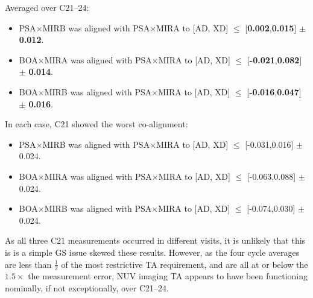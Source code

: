 Averaged over C21--24:
\footnotesize
\begin{itemize}
\item PSA$\times$MIRB was aligned with PSA$\times$MIRA to [AD, XD] $\le$ [{\bf 0.002},{\bf 0.015}] $\pm$ {\bf 0.012}\arcsec.
\item BOA$\times$MIRA was aligned with PSA$\times$MIRA to [AD, XD] $\le$ [{\bf-0.021},{\bf 0.082}] $\pm$ {\bf 0.014}\arcsec.
\item BOA$\times$MIRB was aligned with PSA$\times$MIRA to [AD, XD] $\le$ [{\bf-0.016},{\bf 0.047}] $\pm$ {\bf 0.016}\arcsec.
\end{itemize}
\normalsize
In each case, C21 showed the worst co-alignment:
\footnotesize
\begin{itemize}
\item PSA$\times$MIRB was aligned with PSA$\times$MIRA to [AD, XD] $\le$ [-0.031,0.016] $\pm$ 0.024\arcsec.
\item BOA$\times$MIRA was aligned with PSA$\times$MIRA to [AD, XD] $\le$ [-0.063,0.088] $\pm$ 0.024\arcsec.
\item BOA$\times$MIRB was aligned with PSA$\times$MIRA to [AD, XD] $\le$ [-0.074,0.030] $\pm$ 0.024\arcsec.
\end{itemize}
\normalsize
As all three C21 measurements occurred in different visits, it is unlikely that this is is a simple GS issue skewed
these results. However, as the four cycle averages are less than $\frac{1}{2}$ of the most restrictive TA requirement, and are
all at or below the $1.5\times$ the measurement error, NUV imaging TA appears to have been functioning nominally,
if not exceptionally, over C21--24.


